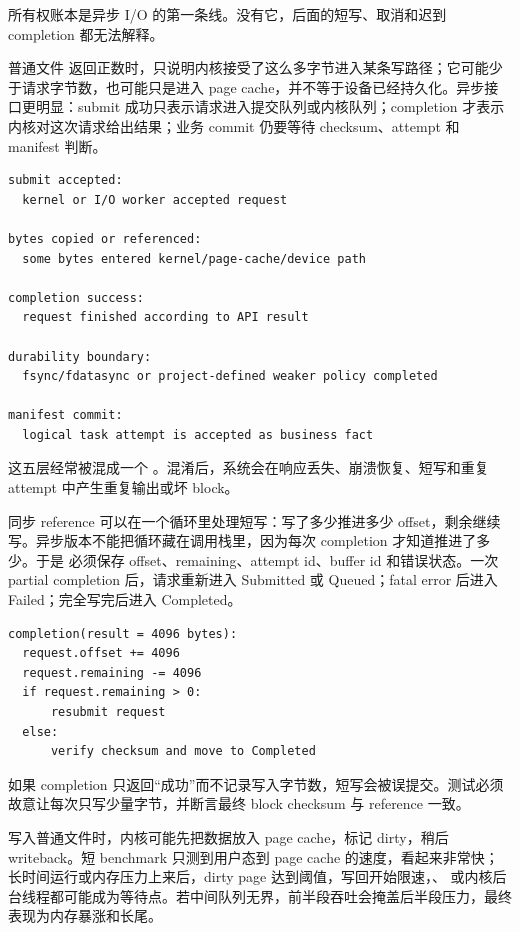 所有权账本是异步 I/O 的第一条线。没有它，后面的短写、取消和迟到 completion 都无法解释。

普通文件  返回正数时，只说明内核接受了这么多字节进入某条写路径；它可能少于请求字节数，也可能只是进入 page cache，并不等于设备已经持久化。异步接口更明显：submit 成功只表示请求进入提交队列或内核队列；completion 才表示内核对这次请求给出结果；业务 commit 仍要等待 checksum、attempt 和 manifest 判断。

\begin{lstlisting}[numbers=none,caption={写出成功的层级}]
submit accepted:
  kernel or I/O worker accepted request

bytes copied or referenced:
  some bytes entered kernel/page-cache/device path

completion success:
  request finished according to API result

durability boundary:
  fsync/fdatasync or project-defined weaker policy completed

manifest commit:
  logical task attempt is accepted as business fact
\end{lstlisting}

这五层经常被混成一个 。混淆后，系统会在响应丢失、崩溃恢复、短写和重复 attempt 中产生重复输出或坏 block。

同步 reference 可以在一个循环里处理短写：写了多少推进多少 offset，剩余继续写。异步版本不能把循环藏在调用栈里，因为每次 completion 才知道推进了多少。于是  必须保存 offset、remaining、attempt id、buffer id 和错误状态。一次 partial completion 后，请求重新进入 Submitted 或 Queued；fatal error 后进入 Failed；完全写完后进入 Completed。

\begin{lstlisting}[numbers=none,caption={异步短写状态推进}]
completion(result = 4096 bytes):
  request.offset += 4096
  request.remaining -= 4096
  if request.remaining > 0:
      resubmit request
  else:
      verify checksum and move to Completed
\end{lstlisting}

如果 completion 只返回“成功”而不记录写入字节数，短写会被误提交。测试必须故意让每次只写少量字节，并断言最终 block checksum 与 reference 一致。

写入普通文件时，内核可能先把数据放入 page cache，标记 dirty，稍后 writeback。短 benchmark 只测到用户态到 page cache 的速度，看起来非常快；长时间运行或内存压力上来后，dirty page 达到阈值，写回开始限速，、 或内核后台线程都可能成为等待点。若中间队列无界，前半段吞吐会掩盖后半段压力，最终表现为内存暴涨和长尾。


